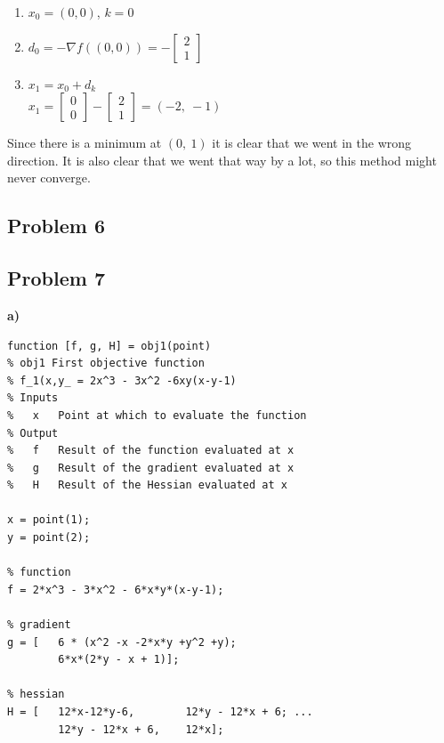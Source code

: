 \begin{enumerate}
\item $x_0 = (0,0)$, $k = 0$
\item $d_0 = - \nabla f((0,0)) = - \begin{bmatrix}
2 \\
1
\end{bmatrix}$
\item $x_1 = x_0 + d_k$ \\
$x_1 = \begin{bmatrix}
0 \\ 0
\end{bmatrix} - \begin{bmatrix}
2 \\ 1
\end{bmatrix} = (-2,\ -1)$
\end{enumerate}

Since there is a minimum at $(0,\ 1)$ it is clear that we went in the wrong direction. It is also clear that we went that way by a lot, so this method might never converge.

\subsection{Problem 6}

\incomplete

\subsection{Problem 7}

\textbf{a)}

\begin{lstlisting}[style=Matlab-editor]
function [f, g, H] = obj1(point)
% obj1 First objective function
% f_1(x,y_ = 2x^3 - 3x^2 -6xy(x-y-1)
% Inputs
%   x   Point at which to evaluate the function
% Output
%   f   Result of the function evaluated at x
%   g   Result of the gradient evaluated at x
%   H   Result of the Hessian evaluated at x

x = point(1);
y = point(2);

% function
f = 2*x^3 - 3*x^2 - 6*x*y*(x-y-1);

% gradient
g = [   6 * (x^2 -x -2*x*y +y^2 +y);
        6*x*(2*y - x + 1)];

% hessian
H = [   12*x-12*y-6,        12*y - 12*x + 6; ...
        12*y - 12*x + 6,    12*x];

\end{lstlisting}


